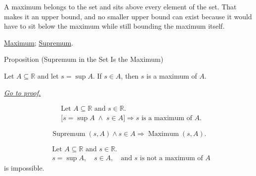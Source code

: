 \begin{remark*}[Interpretation]
A maximum belongs to the set and sits above every element of the set. That makes it an upper bound, and no smaller upper bound can exist because it would have to sit below the maximum while still bounding the maximum itself.
\end{remark*}

\begin{remark*}[Dependencies]
\hyperref[def:maximum]{Maximum};
\hyperref[def:supremum]{Supremum}.
\end{remark*}


\begin{propositionbox}{Proposition (Supremum in the Set Is the Maximum)}
\begin{proposition}
\label{prop:supremum-in-the-set-is-the-maximum}
Let $A\subseteq\mathbb{R}$ and let $s=\sup A$. If $s\in A$, then $s$ is a maximum of $A$.

\smallskip
\noindent
\hyperref[prf:supremum-in-the-set-is-the-maximum]{\textit{Go to proof.}}
\end{proposition}
\end{propositionbox}

\begin{remark*}
\[
\begin{aligned}
&\text{Let }A\subseteq\mathbb{R}\text{ and }s\in\mathbb{R}.\\
&\bigl[s=\sup A\;\land\;s\in A\bigr]
\Longrightarrow
s\text{ is a maximum of }A.
\end{aligned}
\]
\end{remark*}

\begin{remark*}
\[
\operatorname{Supremum}(s,A)\land s\in A
\Longrightarrow
\operatorname{Maximum}(s,A).
\]
\end{remark*}

\begin{remark*}
\[
\begin{aligned}
&\text{Let }A\subseteq\mathbb{R}\text{ and }s\in\mathbb{R}.\\
&s=\sup A,\quad s\in A,\quad\text{and }s\text{ is not a maximum of }A
\end{aligned}
\]
is impossible.
\end{remark*}

